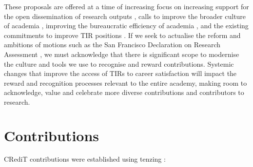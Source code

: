\documentclass[authordate,meta]{jote-new-article}
\begin{document}
These proposals are offered at a time of increasing focus on increasing support for the open dissemination of research outputs \parencites{Concordatgroup_concordat_2016}{Nelson2022}{Unesco2021}, calls to improve the broader culture of academia \parencites{Coara2022}{WellcomeTrust2020}, improving the bureaucratic efficiency of academia \parencites{IndependentReviewofResearchBureaucracy2022}, and the existing commitments to improve TIR positions \parencites{NCRIS2022}{TechnicianCommitment2020}. If we seek to actualise the reform and ambitions of motions such as the San Francisco Declaration on Research Assessment \parencites{Dora2012}, we must acknowledge that there is significant scope to modernise the culture and tools we use to recognise and reward contributions. Systemic changes that improve the access of TIRs to career satisfaction will impact the reward and recognition processes relevant to the entire academy, making room to acknowledge, value and celebrate more diverse contributions and contributors to research.





\section{Contributions}
CRediT contributions were established using tenzing \parencites{Holcombe_2020}:
\end{document}
